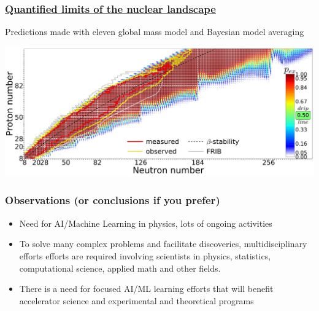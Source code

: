 \documentclass{beamer}
\begin{document}
\begin{frame}
\frametitle{\href{{https://journals.aps.org/prc/abstract/10.1103/PhysRevC.101.044307}}{Quantified limits of the nuclear landscape}}

Predictions made with eleven global mass model and Bayesian model averaging

\vspace{6mm}

\centerline{\includegraphics[width=1.0\linewidth]{figures/landscape.jpg}}

\vspace{6mm}
\end{frame}

\begin{frame}
\frametitle{Observations (or conclusions if you prefer)}

\begin{block}{}
\begin{itemize}
\item Need for AI/Machine Learning in physics, lots of ongoing activities

\item To solve many complex problems and facilitate discoveries, multidisciplinary efforts efforts are required involving scientists in  physics, statistics, computational science, applied math and other fields.

\item There is a need for  focused AI/ML learning efforts that will benefit accelerator science and experimental and theoretical programs
\end{itemize}

\noindent
\end{block}
\end{frame}
\end{document}
